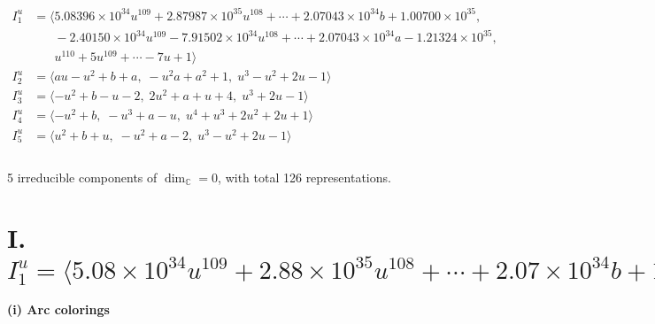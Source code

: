 \documentclass[1p]{elsarticle_modified}
\theoremstyle{definition}
\begin{document}
\begin{align*}
I^u_{1}&=\langle 
5.08396\times10^{34} u^{109}+2.87987\times10^{35} u^{108}+\cdots+2.07043\times10^{34} b+1.00700\times10^{35},\\
\phantom{I^u_{1}}&\phantom{= \langle  }-2.40150\times10^{34} u^{109}-7.91502\times10^{34} u^{108}+\cdots+2.07043\times10^{34} a-1.21324\times10^{35},\\
\phantom{I^u_{1}}&\phantom{= \langle  }u^{110}+5 u^{109}+\cdots-7 u+1\rangle \\
I^u_{2}&=\langle 
a u- u^2+b+a,\;- u^2 a+a^2+1,\;u^3- u^2+2 u-1\rangle \\
I^u_{3}&=\langle 
- u^2+b- u-2,\;2 u^2+a+u+4,\;u^3+2 u-1\rangle \\
I^u_{4}&=\langle 
- u^2+b,\;- u^3+a- u,\;u^4+u^3+2 u^2+2 u+1\rangle \\
I^u_{5}&=\langle 
u^2+b+u,\;- u^2+a-2,\;u^3- u^2+2 u-1\rangle \\
\\
\end{align*}
\raggedright * 5 irreducible components of $\dim_{\mathbb{C}}=0$, with total 126 representations.\\
\newpage
\renewcommand{\arraystretch}{1}
\centering \section*{I. $I^u_{1}= \langle 5.08\times10^{34} u^{109}+2.88\times10^{35} u^{108}+\cdots+2.07\times10^{34} b+1.01\times10^{35},\;-2.40\times10^{34} u^{109}-7.92\times10^{34} u^{108}+\cdots+2.07\times10^{34} a-1.21\times10^{35},\;u^{110}+5 u^{109}+\cdots-7 u+1 \rangle$}
\flushleft \textbf{(i) Arc colorings}\\
\end{document}
